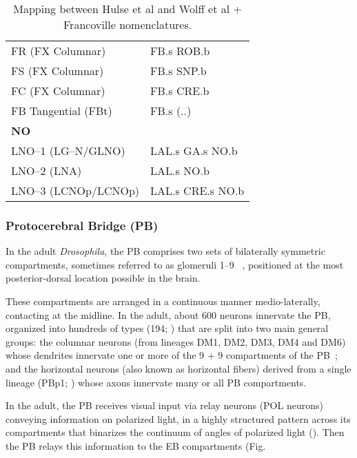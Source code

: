 \begin{table}[ht]
\begin{tabular}{l|l}
        FR (FX Columnar) & FB.s ROB.b \\
        FS (FX Columnar) & FB.s SNP.b \\
        FC (FX Columnar) & FB.s CRE.b \\
        FB Tangential (FBt) & FB.s (..) \\
        \midrule
        \multicolumn{2}{l}{\textbf{NO}} \\[2pt]
        LNO–1 (LG–N/GLNO) & LAL.s GA.s NO.b \\
        LNO–2 (LNA) & LAL.s NO.b \\
        LNO–3 (LCNOp/LCNOp) & LAL.s CRE.s NO.b \\
        \bottomrule
        \end{tabular}
        \caption[\textit{Drosophila} Adult Central Complex Neurons]{Mapping between Hulse et al and Wolff et al + Francoville nomenclatures.}
        \label{tab:hulse-wolff-francoville}
        \end{table}


        \subsubsection{Protocerebral Bridge (PB)}
        In the adult \textit{Drosophila}, the PB comprises two sets of bilaterally symmetric compartments, sometimes referred to as glomeruli 1–9 ~\cite{hulse2021connectome}, positioned at the most posterior-dorsal location possible in the brain.

        These compartments are arranged in a continuous manner medio-laterally, contacting at the midline. In the adult, about 600 neurons innervate the PB, organized into hundreds of types (194; \citep{wolff2015neuroarchitecture}) that are split into two main general groups: the columnar neurons (from lineages DM1, DM2, DM3, DM4 and DM6) whose dendrites innervate one or more of the 9 + 9 compartments of the PB~\citep{wolff2015neuroarchitecture}; and the horizontal neurons (also known as horizontal fibers) derived from a single lineage (PBp1; \citep{andrade2019developmentally}) whose axons innervate many or all PB compartments.

        In the adult, the PB receives visual input via relay neurons (POL neurons) conveying information on polarized light, in a highly structured pattern across its compartments that binarizes the continuum of angles of polarized light (\citep{heinze2009transformation}). Then the PB relays this information to the EB compartments (Fig. %

